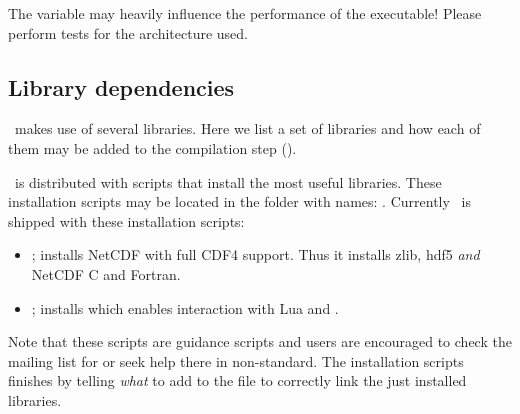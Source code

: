 The variable  may heavily influence the
performance of the executable! Please perform tests for the
architecture used.


\subsection{Library dependencies}
\label{sec:libs}

\siesta\ makes use of several libraries. Here we list a set of
libraries and how each of them may be added to the compilation step
().

\siesta\ is distributed with scripts that install the most useful
libraries. These installation scripts may be located in the
 folder with names: .
Currently \siesta\ is shipped with these installation scripts:
\begin{itemize}
  \item {}; installs NetCDF with full CDF4
  support. Thus it installs zlib, hdf5 \emph{and} NetCDF C and
  Fortran.

  \item {}; installs  which
  enables interaction with Lua and \siesta.
  
\end{itemize}
Note that these scripts are guidance scripts and users are encouraged
to check the mailing list for or seek help there in non-standard. The
installation scripts finishes by telling \emph{what} to add to the
 file to correctly link the just installed libraries.

